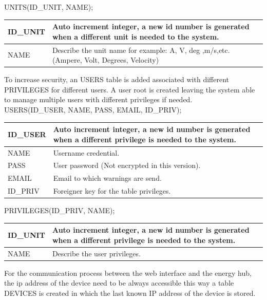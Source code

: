 UNITS(ID\_UNIT, NAME);

\begin{table}[H]
\centering
	\begin{tabular}{| p{2cm} | p{10cm} |}
		\hline
		ID\_UNIT & Auto increment integer, a new id number is generated when a different unit is needed to the system. \\\hline
		NAME & Describe the unit name for example: A, V, deg ,m/s,etc. (Ampere, Volt, Degrees, Velocity)\\\hline
	\end{tabular}
\end{table}
To increase security, an USERS table is added associated with different PRIVILEGES for different users. A user root is created leaving the system able to manage multiple users with different privileges if needed.
\\

USERS(ID\_USER, NAME, PASS, EMAIL, ID\_PRIV);

\begin{table}[H]
\centering
	\begin{tabular}{| p{2cm} | p{10cm} |}
		\hline
		ID\_USER & Auto increment integer, a new id number is generated when a different privilege is needed to the system. \\\hline
		NAME & Username credential. \\\hline
		PASS & User password (Not encrypted in this version). \\\hline
		EMAIL & Email to which warnings are send. \\\hline
		ID\_PRIV & Foreigner key for the table privileges. \\\hline
	\end{tabular}
\end{table}

PRIVILEGES(ID\_PRIV, NAME);

\begin{table}[H]
\centering
	\begin{tabular}{| p{2cm} | p{10cm} |}
		\hline
		ID\_UNIT & Auto increment integer, a new id number is generated when a different privilege is needed to the system. \\\hline
		NAME & Describe the user privileges. \\\hline
	\end{tabular}
\end{table}
For the communication process between the web interface and the energy hub, the ip address of the device need to be always accessible this way a table DEVICES is created in which the last known IP address of the device is stored.
\\\\

